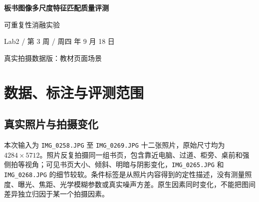 
\usepackage{booktabs,tabularx,caption}
\captionsetup{font=small,labelfont=bf,skip=5pt}
\graphicspath{{../figures/p2-real/}}
\linespread{1.25}
\newcommand{\filepath}[1]{\nolinkurl{#1}}


\begin{center}
{\LARGE\bfseries 板书图像多尺度特征匹配质量评测}\par
\vspace{3mm}
{\large 可重复性消融实验}\par
\vspace{2mm}
{\small Lab2 / 第 3 周 / 周四  年 9 月 18 日}\par
{\small 真实拍摄数据版：教材页面场景}
\end{center}

\begin{abstract}
围绕文字类图像在光照、拍摄尺度和模糊变化下的特征稳定性，建立单一 Python 文件实现的评测流程，比较 Sobel、LoG、Harris、Shi-Tomasi、SIFT 五类匹配管线，结合 FFT 理想/高斯低通、高通预处理及一至三层外部金字塔，统计重复率、匹配正确率、定位误差和运行时间。使用用户提供的十二张同一教材页面的手机照片，一张作参考，其余十一张与参考形成图对；经逐张视觉选点、局部灰度配准辅助和助手放大图核对，共保留二百五十对同名点，每个图对不少于二十对。实验包含三千二百四十五行评测，并绘制尺度、噪声、金字塔深度及三个组件关闭消融的曲线。教材页面不是题目指定的板书或试卷，助手制作的标注也不等同于学生亲手标注，这两项来源边界不作隐瞒。书页弯曲使单应几何参照带有近似误差，结果应联合匹配数量和几何残差解读，而非仅凭一个比例判定可信度。
\end{abstract}

\section{数据、标注与评测范围}
\subsection{真实照片与拍摄变化}
本次输入为 \filepath{IMG_0258.JPG} 至 \filepath{IMG_0269.JPG} 十二张照片，原始尺寸均为 $4284\times5712$。照片反复拍摄同一组书页，包含靠近电脑、过道、柜旁、桌前和强侧拍等视角；可见书页大小、倾斜、明暗与阴影变化，\filepath{IMG_0265.JPG} 和 \filepath{IMG_0268.JPG} 的细节较软。条件标签是从照片内容得到的定性描述，没有测量照度、曝光、焦距、光学模糊参数或真实噪声方差。原生因素同时变化，不能把图间差异独立归因于某一个拍摄因素。

